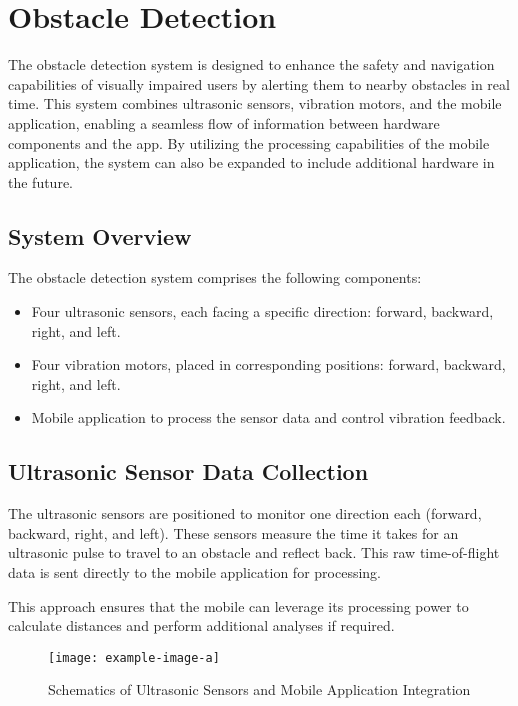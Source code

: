 \section{Obstacle Detection}

The obstacle detection system is designed to enhance the safety and navigation capabilities of visually impaired users by alerting them to nearby obstacles in real time. This system combines ultrasonic sensors, vibration motors, and the mobile application, enabling a seamless flow of information between hardware components and the app. By utilizing the processing capabilities of the mobile application, the system can also be expanded to include additional hardware in the future.

\subsection{System Overview}

The obstacle detection system comprises the following components:

\begin{itemize}
	\item Four ultrasonic sensors, each facing a specific direction: forward, backward, right, and left.
	\item Four vibration motors, placed in corresponding positions: forward, backward, right, and left.
	\item Mobile application to process the sensor data and control vibration feedback.
\end{itemize}

\subsection{Ultrasonic Sensor Data Collection}

The ultrasonic sensors are positioned to monitor one direction each (forward, backward, right, and left). These sensors measure the time it takes for an ultrasonic pulse to travel to an obstacle and reflect back. This raw time-of-flight data is sent directly to the mobile application for processing.

This approach ensures that the mobile can leverage its processing power to calculate distances and perform additional analyses if required.

\begin{figure}[h]
	\centering
	\texttt{[image: example-image-a]}
	\caption{Schematics of Ultrasonic Sensors and Mobile Application Integration}
	\label{fig:schematic_ultrasonic}
\end{figure}


